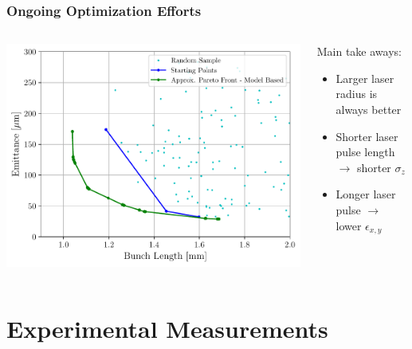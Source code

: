 \documentclass[professionalfonts,t]{beamer}
\begin{document}
\begin{frame}
	\frametitle{Ongoing Optimization Efforts}
\begin{columns}[T] %
	\begin{column}{.56\textwidth}
		\vspace{1em}
		\includegraphics[width=1.0\linewidth, right]{../images/pareto_emittance_vs_zrms}
	\end{column}%
	\hfill%
	\begin{column}{.44\textwidth}
		\vspace{1em}
		Main take aways:
		\begin{itemize}
		\item Larger laser radius is always better
		\item Shorter laser pulse length $\rightarrow$ shorter $\sigma_z$
		\item Longer laser pulse $\rightarrow$ lower $\epsilon_{x,y}$
	    \end{itemize}	
	\end{column}%
\end{columns}
\end{frame}
\section{Experimental Measurements}
\end{document}
